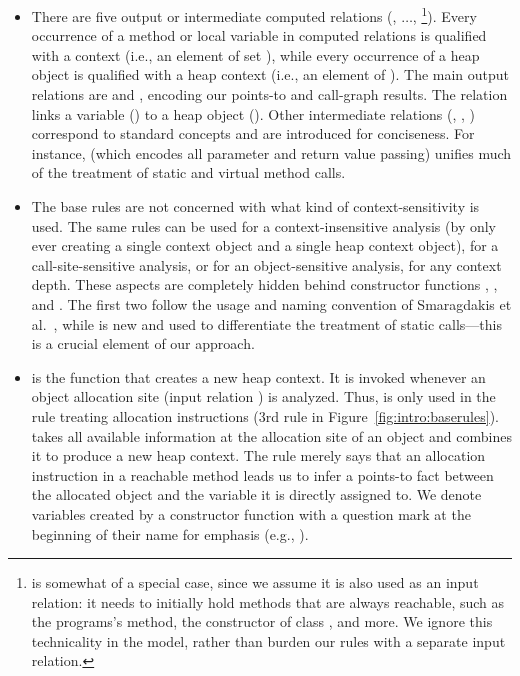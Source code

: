 \begin{itemize}
\item There are five output or intermediate computed relations (, $\ldots$, \footnote{ is somewhat of a special case, since we assume it is also used as an input relation: it needs to initially hold methods that are always reachable, such as the programs's  method, the constructor of class , and more. We ignore this technicality in the model, rather than burden our rules with a separate input relation.}). Every occurrence of a method or local variable in computed relations is qualified with a context (i.e., an element of set ), while every occurrence of a heap object is qualified with a heap context (i.e., an element of ). The main output relations are  and , encoding our points-to and call-graph results. The  relation links a variable () to a heap object (). Other intermediate relations (, , ) correspond to standard concepts and are introduced for conciseness. For instance,  (which encodes all parameter and return value passing) unifies much of the treatment of static and virtual method calls.

\item The base rules are not concerned with what kind of context-sensitivity is used. The same rules can be used for a context-insensitive analysis (by only ever creating a single context object and a single heap context object), for a call-site-sensitive analysis, or for an object-sensitive analysis, for any context depth. These aspects are completely hidden behind constructor functions , , and . The first two follow the usage and naming convention of Smaragdakis et al.~\cite{popl:2011:Smaragdakis}, while  is new and used to differentiate the treatment of static calls---this is a crucial element of our approach.

\item {} is the function that creates a new heap context. It is invoked whenever an object allocation site (input relation ) is analyzed. Thus,  is only used in the rule treating allocation instructions (3rd rule in Figure~\ref{fig:intro:baserules}).  takes all available information at the allocation site of an object and combines it to produce a new heap context. The rule merely says that an allocation instruction in a reachable method leads us to infer a points-to fact between the allocated object and the variable it is directly assigned to. We denote variables created by a constructor function with a question mark at the beginning of their name for emphasis (e.g., ).


\end{itemize}
